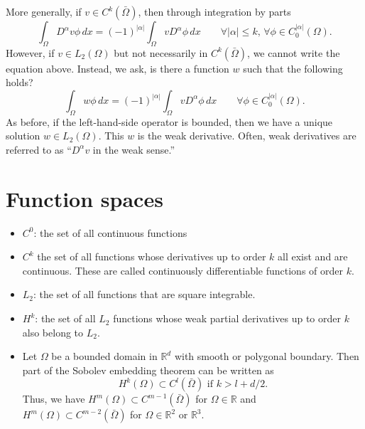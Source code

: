 \documentclass[oneside,a4paper,11pt]{report}
\begin{document}
More generally, if $v \in C^k(\bar{\Omega})$, then through integration by parts
\begin{equation}
    \int_\Omega D^\alpha v \phi \, dx = (-1)^{|\alpha|} \int_\Omega v D^\alpha \phi \, dx \qquad \forall |\alpha| \le k,\, \forall \phi \in C_0^{|\alpha|}(\Omega).
\end{equation}
However, if $v \in L_2(\Omega)$ but not necessarily in $C^k(\bar{\Omega})$, we cannot write the equation above. Instead, we ask, is there a function $w$ such that the following holds?
\begin{equation}
    \int_\Omega w \phi \, dx = (-1)^{|\alpha|} \int_\Omega v D^\alpha \phi \, dx \qquad \forall \phi \in C_0^{|\alpha|}(\Omega).
\end{equation}
As before, if the left-hand-side operator is bounded, then we have a unique solution $w \in L_2(\Omega)$. This $w$ is the weak derivative. Often, weak derivatives are referred to as ``$D^\alpha v$ in the weak sense.''

\section{Function spaces}
\begin{itemize}
    \item $C^0$: the set of all continuous functions
    \item $C^k$ the set of all functions whose derivatives up to order $k$ all exist and are continuous. These are called continuously differentiable functions of order $k$.
    \item $L_2$: the set of all functions that are square integrable.
    \item $H^k$: the set of all $L_2$ functions whose weak partial derivatives up to order $k$ also belong to $L_2$. 
    \item Let $\Omega$ be a bounded domain in $\mathbb{R}^d$ with smooth or polygonal boundary. Then part of the Sobolev embedding theorem can be written as
    \begin{equation}
        H^k(\Omega) \subset C^l(\bar{\Omega}) \text{ if } k > l + d/2.
    \end{equation}
    Thus, we have $H^m(\Omega) \subset C^{m-1}(\bar{\Omega})$ for $\Omega \in \mathbb{R}$ and $H^m(\Omega) \subset C^{m-2}(\bar{\Omega})$ for $\Omega \in \mathbb{R}^2$ or $\mathbb{R}^3$.
\end{itemize}
\end{document}
